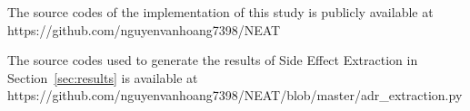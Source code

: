 \documentclass{bmcart}
\begin{document}
\begin{backmatter}
The source codes of the implementation of this study is publicly available at https://github.com/nguyenvanhoang7398/NEAT

The source codes used to generate the results of Side Effect Extraction in Section~\ref{sec:results} is available at https://github.com/nguyenvanhoang7398/NEAT/blob/master/adr\_extraction.py







\end{backmatter}
\end{document}
